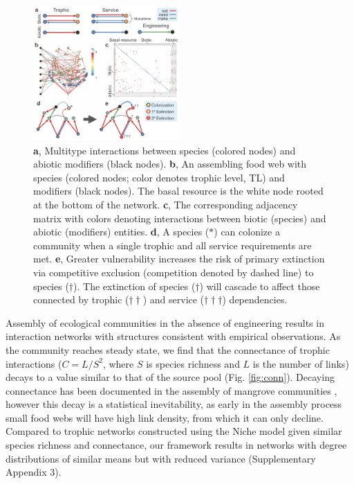 \documentclass[twocolumn,preprintnumbers,amsmath,amssymb,superscriptaddress,linenumbers]{revtex4-1}
\begin{document}
\begin{figure}[h!]
\centering
\includegraphics[width=0.5\textwidth]{fig_model.png}
\vspace{0mm}
\caption{
\textbf{a}, Multitype interactions between species (colored nodes) and abiotic modifiers (black nodes).
\textbf{b}, An assembling food web with species (colored nodes; color denotes trophic level, TL) and modifiers (black nodes). The basal resource is the white node rooted at the bottom of the network.
\textbf{c}, The corresponding adjacency matrix with colors denoting interactions between biotic (species) and abiotic (modifiers) entities.
\textbf{d}, A species ($\ast$) can colonize a community when a single trophic and all service requirements are met.
\textbf{e}, Greater vulnerability increases the risk of primary extinction via competitive exclusion (competition denoted by dashed line) to species ($\dag$).
The extinction of species ($\dag$) will cascade to affect those connected by trophic ($\dag \dag$) and service ($\dag \dag \dag$) dependencies. 
\vspace{-3mm}
}
\vspace{0mm}
\label{fig:model}
\end{figure}

Assembly of ecological communities in the absence of engineering results in interaction networks with structures consistent with empirical observations.
As the community reaches steady state, we find that the connectance of trophic interactions ($C=L/S^2$, where $S$ is species richness and $L$ is the number of links) decays to a value similar to that of the source pool (Fig. \ref{fig:conn}).
Decaying connectance has been documented in the assembly of mangrove communities \cite{Piechnik2008}, however this decay is a statistical inevitability, as early in the assembly process small food webs will have high link density, from which it can only decline.
Compared to trophic networks constructed using the Niche model \cite{Williams2000} given similar species richness and connectance, our framework results in networks with degree distributions of similar means but with reduced variance (Supplementary Appendix 3).
\end{document}
